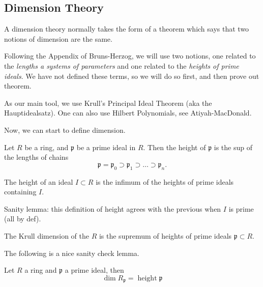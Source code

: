 \subsection{Dimension Theory}

A dimension theory normally takes the form of 
a theorem which says that two notions of dimension
are the same. 

Following the Appendix of Bruns-Herzog, we will use two 
notions, one related to the
\textit{lengths a systems of parameters} and one 
related to the \textit{heights of prime ideals}. 
We have not defined these terms, so we will do so first, and then
prove out theorem.

As our main tool, we use Krull's Principal Ideal Theorem
(aka the Hauptidealsatz). 
One can also use Hilbert Polynomials, see Atiyah-MacDonald.


Now, we can start to define dimension.

\begin{definition}
  \label{def:height_prime_ideal}
  Let $R$ be a ring, and $\mathfrak{p}$
  be a prime ideal in $R$.
  Then the height of $\mathfrak{p}$ is the sup of
  the lengths of chains
  \[
    \mathfrak{p} = \mathfrak{p}_0 \supset \mathfrak{p}_1 \supset \dots \supset \mathfrak{p}_n
   . \]
\end{definition}


\newcommand{\height}{\operatorname{height}}


\begin{definition}
    \label{def:height_arbitrary_ideal}
    The height of an ideal \(I \subset R\)
    is the infimum of the heights of
    prime ideals containing \(I\).
\end{definition}
    
Sanity lemma: this definition of height agrees
with the previous when \(I\) is prime (all by def).

\begin{definition}
    \label{def:krull_dim_ring}
    The Krull dimension of the \(R\)
    is the supremum of heights of prime
    ideals \(\mathfrak{p} \subset R\).
\end{definition}
    
The following is a nice sanity check lemma.
    
\begin{lemma}
    \label{lem:dim_local_eq_height_prime}
    Let \(R\) a ring and \(\mathfrak{p}\) a
    prime ideal, then
    \[
    \dim R_{\mathfrak{p}} = \height \mathfrak{p}
    \]
\end{lemma}
    
